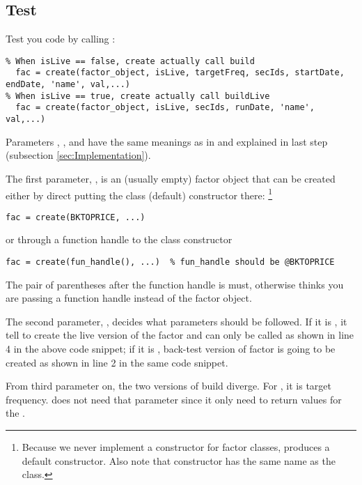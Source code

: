 \subsection{Test\label{sec:Test}}

Test you code by calling :
\begin{lstlisting}
% When isLive == false, create actually call build
  fac = create(factor_object, isLive, targetFreq, secIds, startDate, endDate, 'name', val,...)
% When isLive == true, create actually call buildLive
  fac = create(factor_object, isLive, secIds, runDate, 'name', val,...)
\end{lstlisting}

    Parameters , ,  and  
    have the same meanings as in  and  explained in last step
    (subsection \ref{sec:Implementation}).
    
    The first parameter, , 
    is an (usually empty) factor object that can be created either by direct putting the class (default) constructor there:
    \footnote{Because we never implement a constructor for factor classes, 
             \matlab{} produces a default constructor.
             Also note that constructor has the same name as the class.}   
\begin{lstlisting}[numbers=none]
  fac = create(BKTOPRICE, ...)
\end{lstlisting}
    or through a function handle to the class constructor
\begin{lstlisting}[numbers=none]
  fac = create(fun_handle(), ...)  % fun_handle should be @BKTOPRICE
\end{lstlisting}
    The pair of parentheses after the function handle is must, 
    otherwise \matlab{} thinks you are passing a function handle instead of the factor object.

   The second parameter, ,
   decides what parameters should be followed.
   If it is , it tell  to create the live version of
   the factor and can only be called as shown in line 4 in the above code snippet;
   if it is , back-test version of factor is going to be created
   as shown in line 2 in the same code snippet.

   From third parameter on, the two versions of build diverge.
   For , it is target frequency.
    does not need that parameter since it only need to return values for the .

